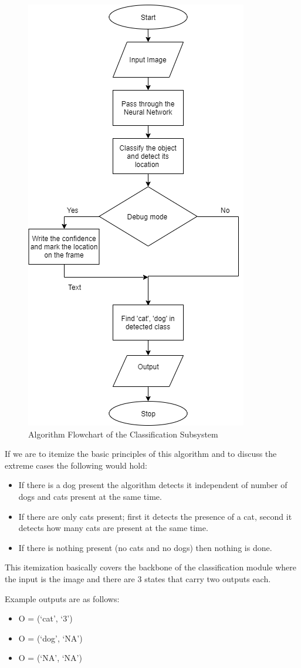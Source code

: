 \begin{figure}[h!]
    \centering
    \includegraphics[width=0.4\linewidth]{content/010_introduction/img/classify_block.png}
    \caption{Algorithm Flowchart of the Classification Subsystem}
    \label{fig:classify_algorithm_flowchart}
\end{figure}

If we are to itemize the basic principles of this algorithm and to discuss the extreme cases the following would hold: 

\begin{itemize}
    \item If there is a dog present the algorithm detects it independent of number of dogs and cats present at the same time. 
    \item If there are only cats present; first it detects the presence of a cat, second it detects how many cats are present at the same time. 
    \item If there is nothing present (no cats and no dogs) then nothing is done.
\end{itemize}

This itemization basically covers the backbone of the classification module where the input is the image and there are 3 states that carry two outputs each. 

Example outputs are as follows: 

\begin{itemize}
    \item O = (`cat', `3')
    \item O = (`dog', `NA')
    \item O = (`NA', `NA')
\end{itemize}

